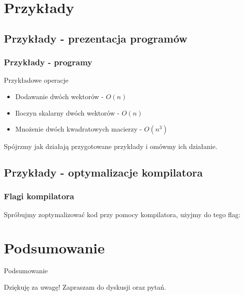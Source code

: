 \documentclass{if-beamer}
\begin{document}
\section{Przykłady}
\subsection{Przykłady - prezentacja programów}
\begin{frame}
\frametitle{Przykłady - programy}

\begin{block}{Przykładowe operacje}
\begin{itemize}
  \item Dodawanie dwóch wektorów - $O(n)$
  \item Iloczyn skalarny dwóch wektorów - $O(n)$ 
  \item Mnożenie dwóch kwadratowych macierzy - $O(n^{3})$
\end{itemize}
\end{block}

\centering
Spójrzmy jak działają przygotowane przykłady i omówmy ich działanie.

\end{frame}

\subsection{Przykłady - optymalizacje kompilatora}
\begin{frame}[fragile]

\frametitle{Flagi kompilatora}

\centering
Spróbujmy zoptymalizować kod przy pomocy kompilatora, użyjmy do tego flag:

\end{frame}

\section{Podsumowanie}
\begin{frame}{Podsumowanie}

\centering
\begin{Large}
Dziękuję za uwagę! \linebreak Zapraszam do dyskusji oraz pytań.
\end{Large}
\end{frame}

\end{document}
